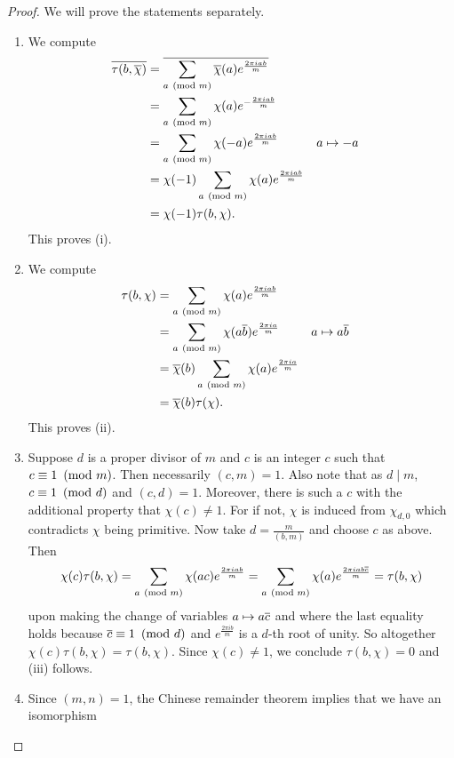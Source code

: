       \begin{proof}
        We will prove the statements separately.
        \begin{enumerate}[label=(\roman*)]
          \item We compute
          \begin{align*}
            \overline{\tau(b,\overline{\chi})} &= \overline{\sum_{a \ \left(\text{mod }m\right)}\overline{\chi}(a)e^{\frac{2\pi iab}{m}}} \\
            &= \sum_{a \ \left(\text{mod }m\right)}\chi(a)e^{-\frac{2\pi iab}{m}} \\
            &= \sum_{a \ \left(\text{mod }m\right)}\chi(-a)e^{\frac{2\pi iab}{m}} && \text{$a \mapsto -a$} \\
            &= \chi(-1)\sum_{a \ \left(\text{mod }m\right)}\chi(a)e^{\frac{2\pi iab}{m}} \\
            &= \chi(-1)\tau(b,\chi).
          \end{align*}
          This proves (i).
          \item We compute
          \begin{align*}
            \tau(b,\chi) &= \sum_{a \ \left(\text{mod }m\right)}\chi(a)e^{\frac{2\pi iab}{m}} \\
            &= \sum_{a \ \left(\text{mod }m\right)}\chi(a\overline{b})e^{\frac{2\pi ia}{m}} && \text{$a \mapsto a\overline{b}$} \\
            &= \overline{\chi}(b)\sum_{a \ \left(\text{mod }m\right)}\chi(a)e^{\frac{2\pi ia}{m}} \\
            &= \overline{\chi}(b)\tau(\chi).
          \end{align*}
          This proves (ii).
          \item Suppose $d$ is a proper divisor of $m$ and $c$ is an integer $c$ such that $c \equiv 1 \ \left(\text{mod }m\right)$. Then necessarily $(c,m) = 1$. Also note that as $d \mid m$, $c \equiv 1 \ \left(\text{mod }d\right)$ and $(c,d) = 1$. Moreover, there is such a $c$ with the additional property that $\chi(c) \neq 1$. For if not, $\chi$ is induced from $\chi_{d,0}$ which contradicts $\chi$ being primitive. Now take $d = \frac{m}{(b,m)}$ and choose $c$ as above. Then
          \[
            \chi(c)\tau(b,\chi) = \sum_{a \ \left(\text{mod }m\right)}\chi(ac)e^{\frac{2\pi iab}{m}} = \sum_{a \ \left(\text{mod }m\right)}\chi(a)e^{\frac{2\pi iab\overline{c}}{m}} = \tau(b,\chi)
          \]
          upon making the change of variables $a \mapsto a\overline{c}$ and where the last equality holds because $\overline{c} \equiv 1 \ \left(\text{mod }d\right)$ and $e^{\frac{2\pi ib}{m}}$ is a $d$-th root of unity. So altogether $\chi(c)\tau(b,\chi) = \tau(b,\chi)$. Since $\chi(c) \neq 1$, we conclude $\tau(b,\chi) = 0$ and (iii) follows.
          \item Since $(m,n) = 1$, the Chinese remainder theorem implies that we have an isomorphism

\end{enumerate}
\end{proof}
